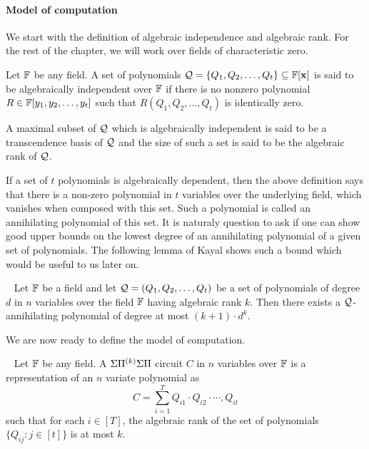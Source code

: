 \paragraph{Model of computation}
We start with the definition of algebraic independence and algebraic rank. For the rest of the chapter, we will work over fields of characteristic zero. 
\begin{definition}
Let $\mathbb{F}$ be any field. A set of polynomials 
${\cal Q} = \{Q_1, Q_2, \ldots, Q_t\} \subseteq \mathbb{F}[\mathbf{x}]$ is said to be algebraically independent over $\mathbb{F}$ if there is no nonzero polynomial $R \in \mathbb{F}[y_1, y_2, \ldots, y_t]$ such that $R(Q_1, Q_2, \ldots, Q_t)$ is identically zero. 

A maximal subset of $\cal Q$ which is algebraically independent is said to be a transcendence basis of $\cal Q$ and the size of such a set is said to be the algebraic rank of $\cal Q$.
\end{definition}

If a set of $t$ polynomials is algebraically dependent, then the above definition says that there is a non-zero polynomial in $t$ variables over the underlying field, which vanishes when composed with this set. Such a polynomial is called an annihilating polynomial of this set. It is naturaly question to ask if one can show good upper bounds on the lowest degree of an annihilating polynomial of a given set of polynomials. The following lemma of Kayal shows such a bound which would be useful to us later on. 
\begin{lemma}~\label{lem:degree upper bound for annihilating poly}
Let $\mathbb{F}$ be a field and let ${\cal Q} = (Q_1, Q_2, \ldots, Q_t)$ be a set of polynomials of degree $d$ in $n$ variables over the field $\mathbb{F}$ having algebraic rank $k$. Then there exists a $\cal Q$-annihilating polynomial
of degree at most $(k+1)\cdot d^k$.
\end{lemma}  




We are now ready to define the model of computation. 

\begin{definition}~\label{def:lb model}
Let $\mathbb{F}$ be any field. A $\Sigma{\Pi^{(k)}}\Sigma\Pi$ circuit $C$ in $n$ variables over $\mathbb{F}$ is a representation of an $n$ variate polynomial as 
\[C =  \sum_{i = 1}^T  Q_{i1}\cdot  Q_{i2}\cdot  \cdots, Q_{it} \]  
such that for each $i \in [T]$, the algebraic rank of the set of polynomials $\{Q_{ij} : j \in [t]\}$ is at most $k$. 
\end{definition}

